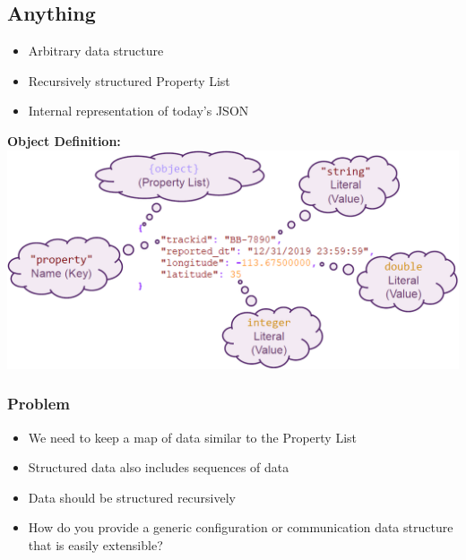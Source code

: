 \subsection{Anything}
\begin{itemize}
    \item Arbitrary data structure
    \item Recursively structured Property List
    \item Internal representation of today's JSON
\end{itemize}
\textbf{Object Definition:}
\includegraphics[width=\linewidth]{./img/anything.png}
\subsubsection{Problem}
\begin{itemize}
    \item We need to keep a map of data similar to the Property List
    \item Structured data also includes sequences of data
    \item Data should be structured recursively
    \item How do you provide a generic configuration or communication data structure that is easily extensible?
\end{itemize}
